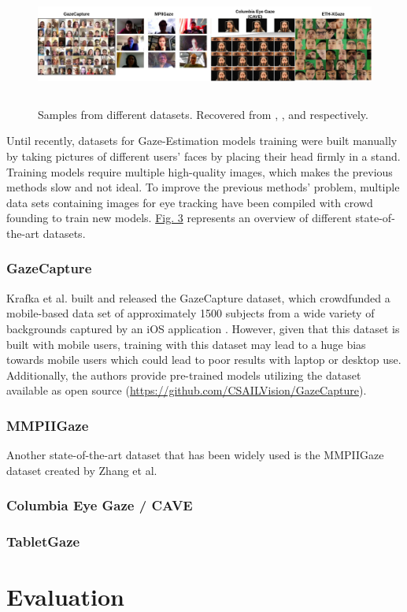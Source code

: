\begin{figure}
    \centering
    \includegraphics[width=\textwidth,height=4cm]{img/figures/datasets.png}
    \caption{Samples from different datasets. Recovered from \cite{GazeCapture}, \cite{GazeEstimationInTheWild}, \cite{CAVE_0324} and \cite{Zhang2020ETHXGaze} respectively. }
    \label{Datasets}
 \end{figure}

Until recently, datasets for Gaze-Estimation models training were built manually by taking pictures of different users' faces by placing their head firmly in a stand. Training models require multiple high-quality images, which makes the previous methods slow and not ideal.
To improve the previous methods' problem, multiple data sets containing images for eye tracking have been compiled with crowd founding to train new models.
\hyperref[Datasets]{Fig. 3} represents an overview of different state-of-the-art datasets.

\subsection{GazeCapture}



Krafka et al. built and released the GazeCapture dataset, which crowdfunded a mobile-based data set of approximately 1500 subjects from a wide variety of backgrounds captured by an iOS application \cite{GazeCapture}. However, given that this dataset is built with mobile users, training with this dataset may lead to a huge bias towards mobile users which could lead to poor results with laptop or desktop use.
Additionally, the authors provide pre-trained models utilizing the dataset available as open source (\url{https://github.com/CSAILVision/GazeCapture}).
\subsection{MMPIIGaze}
Another state-of-the-art dataset that has been widely used is the MMPIIGaze dataset created by Zhang et al. \cite{GazeEstimationInTheWild}


\subsection{Columbia Eye Gaze / CAVE}

\subsection{TabletGaze}


\chapter{Evaluation}
\label{Chap2}

